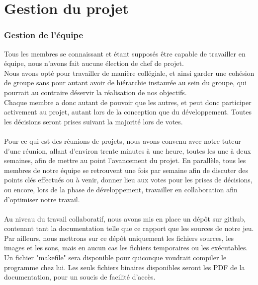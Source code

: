 \documentclass[a4paper]{article}
\newcommand{\alinea}{\hspace*{0.5cm}}
\begin{document}
  \newpage
  \part{Gestion du projet}
    \section{Gestion de l'équipe}
      \alinea Tous les membres se connaissant et étant supposés être capable de travailler en équipe, nous n'avons fait aucune élection de chef de projet.\\
      \alinea Nous avons opté pour travailler de manière collégiale, et ainsi garder une cohésion de groupe sans pour autant avoir de hiérarchie instaurée au sein du groupe, qui pourrait au contraire déservir la réalisation de nos objectifs.\\
      \alinea Chaque membre a donc autant de pouvoir que les autres, et peut donc participer activement au projet, autant lors de la conception que du développement. Toutes les décisions seront prises suivant la majorité lors de votes.\\\\
      \alinea Pour ce qui est des réunions de projets, nous avons convenu avec notre tuteur d'une réunion, allant d'environ trente minutes à une heure, toutes les une à deux semaines, afin de mettre au point l'avancement du projet. En parallèle, tous les membres de notre équipe se retrouvent une fois par semaine afin de discuter des points clés effectués ou à venir, donner lieu aux votes pour les prises de décisions, ou encore, lors de la phase de développement, travailler en collaboration afin d'optimiser notre travail.\\\\
      \alinea Au niveau du travail collaboratif, nous avons mis en place un dépôt sur github, contenant tant la documentation telle que ce rapport que les sources de notre jeu. Par ailleurs, nous mettrons sur ce dépôt uniquement les fichiers sources, les images et les sons, mais en aucun cas les fichiers temporaires ou les exécutables. Un fichier "makefile" sera disponible pour quiconque voudrait compiler le programme chez lui. Les seuls fichiers binaires disponibles seront les PDF de la documentation, pour un soucis de facilité d'accès.
\end{document}
